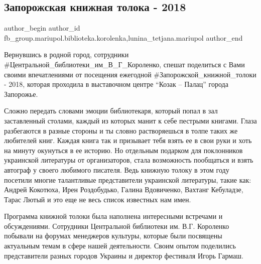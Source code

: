  
 
 
 
 

\subsection{Запорожская книжная толока - 2018}
\label{sec:01_11_2018.fb.fb_group.mariupol.biblioteka.korolenka.1.zaporozhskaya_knizhn}
 
\ifcmt
 author_begin
   author_id fb_group.mariupol.biblioteka.korolenka,lunina_tetjana.mariupol
 author_end
\fi

Вернувшись в родной город, сотрудники \#Центральной\_библиотеки\_им\_В\_Г\_Короленко,
спешат поделиться с Вами своими впечатлениями от посещения ежегодной
\#Запорожской\_книжной\_толоки - 2018, которая проходила в выставочном центре
\enquote{Козак – Палац} города Запорожье.

Сложно передать словами эмоции библиотекаря, который попал в зал заставленный
столами, каждый из которых манит к себе пестрыми книгами. Глаза разбегаются в
разные стороны и ты словно растворяешься в толпе таких же любителей книг.
Каждая книга так и призывает тебя взять ее в свои руки и хоть на минуту
окунуться в ее историю. Но отдельным подарком для поклонников украинской
литературы от организаторов, стала возможность пообщаться и взять автограф у
своего любимого писателя. Ведь книжную толоку в этом году посетили многие
талантливые представители украинской литературы, такие как: Андрей Кокотюха,
Ирен Роздобудько, Галина Вдовиченко, Вахтанг Кебуладзе, Тарас Лютый и это еще
не весь список известных нам имен.

Программа книжной толоки была наполнена интересными встречами и обсуждениями.
Сотрудники Центральной библиотеки им. В.Г. Короленко побывали на форумах
менеджеров культуры, которые были посвящены актуальным темам в сфере нашей
деятельности. Своим опытом поделились представители разных городов Украины и
директор фестиваля Игорь Гармаш.

